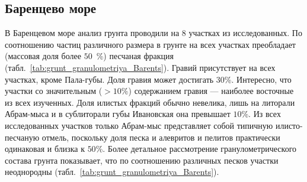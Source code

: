             \subsection{Баренцево море}
В Баренцевом море анализ грунта проводили на 8 участках из исследованных.
По соотношению частиц различного размера в грунте на всех участках преобладает (массовая доля более $50$~\%) песчаная фракция (табл.~\ref{tab:grunt_granulometriya_Barents}). 
Гравий присутствует на всех участках, кроме Пала-губы.  
Доля  гравия может достигать $30$\%. 
Интересно, что участки со значительным ($> 10\%$) содержанием   гравия  ---  наиболее   восточные   из   всех   изученных.   
Доля   илистых   фракций обычно   невелика,   лишь   на   литорали   Абрам-мыса   и   в   сублиторали   губы   Ивановская   она превышает   $10$\%.   
Из   всех   исследованных   участков   только   Абрам-мыс   представляет   собой типичную илисто-песчаную отмель, поскольку доля песка и алевритов и пелитов практически одинаковая и близка к $50$\%.
Более детальное рассмотрение гранулометрического состава грунта показывает, что по соотношению различных песков участки неоднородны (табл.~\ref{tab:grunt_granulometriya_Barents}).
